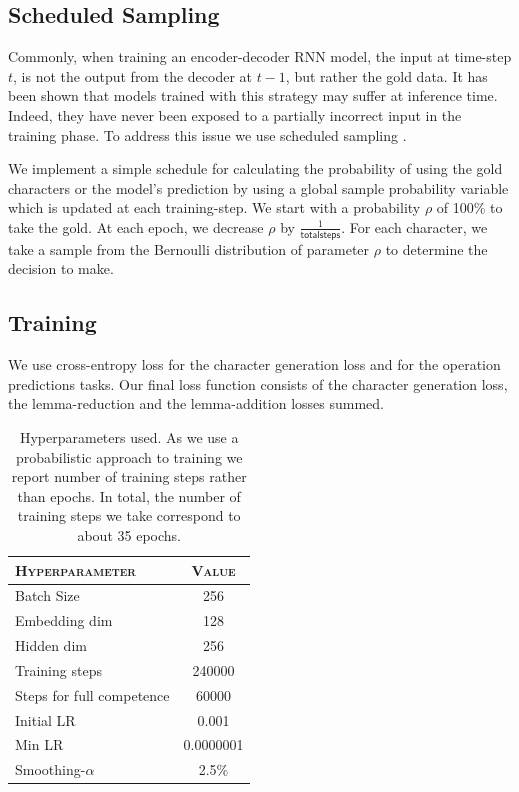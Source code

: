 \documentclass[11pt,a4paper]{article}
\newcommand\jp[1]{\textbf{JP: #1}}
\begin{document}
\subsection{Scheduled Sampling}

Commonly, when training an encoder-decoder RNN model, the input at
time-step $t$, is not the output from the decoder at $t-1$, but rather
the gold data.  It has been shown that models trained with this
strategy may suffer at inference time. Indeed, they have never been
exposed to a partially incorrect input in the training phase.  To
address this issue we use scheduled sampling
\cite{DBLP:conf/nips/BengioVJS15}.

We implement a simple schedule for calculating the probability of
using the gold characters or the model's prediction by using a global
sample probability variable which is updated at each training-step. We
start with a probability \(\rho\) of 100\% to take the gold. At each
epoch, we decrease \(\rho\) by $\frac{1}{\mathsf{total steps}}$. For each
character, we take a sample from the Bernoulli distribution of
parameter \(\rho\) to determine the decision to make.

\subsection{Training}

We use cross-entropy loss for the character generation loss and 
for the operation predictions tasks. Our final loss function consists
of the character generation loss, the lemma-reduction and the
lemma-addition losses summed.

\begin{table}[ht!]	
\centering
\begin{tabular}{lc}
\textsc{Hyperparameter} & \textsc{Value} \\
  \hline
  Batch Size & 256 \\
  Embedding dim & 128 \\
  Hidden dim & 256 \\
  Training steps & 240000 \\
  Steps for full competence & 60000 \\
  Initial LR & 0.001 \\
  Min LR & 0.0000001 \\
  Smoothing-$\alpha$ & 2.5\% \\
\end{tabular} 
\caption{Hyperparameters used. As we use a probabilistic approach to training we report number of training steps rather than epochs. In total, the number of training steps we take correspond to about 35 epochs.}
\label{tab:hp}
\end{table}
\end{document}
